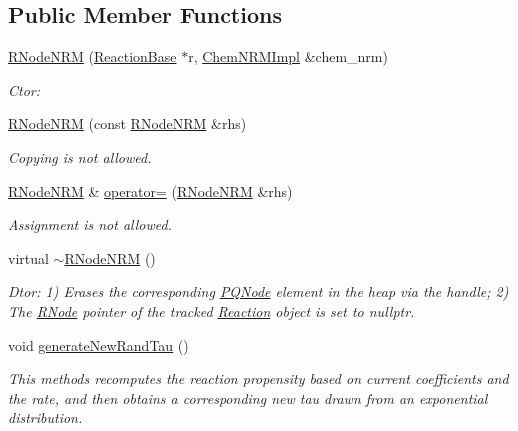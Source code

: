 \subsection*{Public Member Functions}
\begin{DoxyCompactItemize}
\item 
\hyperlink{classchem_1_1RNodeNRM_a4c5827a0d0682ecfbe7c9154ff5644ce}{R\-Node\-N\-R\-M} (\hyperlink{classchem_1_1ReactionBase}{Reaction\-Base} $\ast$r, \hyperlink{classchem_1_1ChemNRMImpl}{Chem\-N\-R\-M\-Impl} \&chem\-\_\-nrm)
\begin{DoxyCompactList}\small\item\em Ctor\-: \end{DoxyCompactList}\item 
\hyperlink{classchem_1_1RNodeNRM_a12d79f33bd69c1b58e18fa4de0d500df}{R\-Node\-N\-R\-M} (const \hyperlink{classchem_1_1RNodeNRM}{R\-Node\-N\-R\-M} \&rhs)
\begin{DoxyCompactList}\small\item\em Copying is not allowed. \end{DoxyCompactList}\item 
\hyperlink{classchem_1_1RNodeNRM}{R\-Node\-N\-R\-M} \& \hyperlink{classchem_1_1RNodeNRM_aba4753c700f2f6d707e2c94b2c5e5749}{operator=} (\hyperlink{classchem_1_1RNodeNRM}{R\-Node\-N\-R\-M} \&rhs)
\begin{DoxyCompactList}\small\item\em Assignment is not allowed. \end{DoxyCompactList}\item 
virtual \hyperlink{classchem_1_1RNodeNRM_ada0f6d009280070f3b89a22ab05c32a2}{$\sim$\-R\-Node\-N\-R\-M} ()
\begin{DoxyCompactList}\small\item\em Dtor\-: 1) Erases the corresponding \hyperlink{classchem_1_1PQNode}{P\-Q\-Node} element in the heap via the handle; 2) The \hyperlink{classchem_1_1RNode}{R\-Node} pointer of the tracked \hyperlink{classchem_1_1Reaction}{Reaction} object is set to nullptr. \end{DoxyCompactList}\item 
void \hyperlink{classchem_1_1RNodeNRM_a33025de761dc8d29928f8e5b1148eff1}{generate\-New\-Rand\-Tau} ()
\begin{DoxyCompactList}\small\item\em This methods recomputes the reaction propensity based on current coefficients and the rate, and then obtains a corresponding new tau drawn from an exponential distribution. \end{DoxyCompactList}\item 

\end{DoxyCompactItemize}
